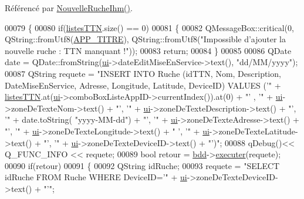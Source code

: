 Référencé par \hyperlink{class_nouvelle_ruche_ihm_a338b9af0b96ed0839a8d5008c8c89cc4}{Nouvelle\+Ruche\+Ihm()}.


\begin{DoxyCode}
00079 \{
00080     \textcolor{keywordflow}{if}(\hyperlink{class_nouvelle_ruche_ihm_a0c97db3419bafe928aabed3aa01d46fb}{listesTTN}.size() == 0)
00081     \{
00082         QMessageBox::critical(0, QString::fromUtf8(\hyperlink{parametres_8h_ace364d1ce44aa9f79bcff6e3752c4a5f}{APP\_TITRE}), QString::fromUtf8(\textcolor{stringliteral}{"Impossible
       d'ajouter la nouvelle ruche : TTN manquant !"}));
00083         \textcolor{keywordflow}{return};
00084     \}
00085 
00086     QDate date = QDate::fromString(\hyperlink{class_nouvelle_ruche_ihm_a46c1f0446fc75c67847d152d89d75960}{ui}->dateEditMiseEnService->text(), \textcolor{stringliteral}{"dd/MM/yyyy"});
00087     QString requete = \textcolor{stringliteral}{"INSERT INTO Ruche (idTTN, Nom, Description, DateMiseEnService, Adresse, Longitude,
       Latitude, DeviceID) VALUES ('"} + \hyperlink{class_nouvelle_ruche_ihm_a0c97db3419bafe928aabed3aa01d46fb}{listesTTN}.at(\hyperlink{class_nouvelle_ruche_ihm_a46c1f0446fc75c67847d152d89d75960}{ui}->comboBoxListeAppID->currentIndex()).at(0) + \textcolor{stringliteral}{"' ,
       '"} + \hyperlink{class_nouvelle_ruche_ihm_a46c1f0446fc75c67847d152d89d75960}{ui}->zoneDeTexteNom->text() + \textcolor{stringliteral}{"', '"} + \hyperlink{class_nouvelle_ruche_ihm_a46c1f0446fc75c67847d152d89d75960}{ui}->zoneDeTexteDescription->text() + \textcolor{stringliteral}{"', '"} + date.toString(\textcolor{stringliteral}{
      "yyyy-MM-dd"}) + \textcolor{stringliteral}{"', '"} + \hyperlink{class_nouvelle_ruche_ihm_a46c1f0446fc75c67847d152d89d75960}{ui}->zoneDeTexteAdresse->text() + \textcolor{stringliteral}{"', '"} + \hyperlink{class_nouvelle_ruche_ihm_a46c1f0446fc75c67847d152d89d75960}{ui}->zoneDeTexteLongitude->text() + \textcolor{stringliteral}{"
      ', '"} + \hyperlink{class_nouvelle_ruche_ihm_a46c1f0446fc75c67847d152d89d75960}{ui}->zoneDeTexteLatitude->text() + \textcolor{stringliteral}{"', '"} + \hyperlink{class_nouvelle_ruche_ihm_a46c1f0446fc75c67847d152d89d75960}{ui}->zoneDeTexteDeviceID->text() + \textcolor{stringliteral}{"')"};
00088     qDebug()<< Q\_FUNC\_INFO << requete;
00089     \textcolor{keywordtype}{bool} retour = \hyperlink{class_nouvelle_ruche_ihm_af552d9e6944c266060860d911878cff7}{bdd}->\hyperlink{class_base_de_donnees_aa8de5f8f8bb17edc43f5c0ee33712081}{executer}(requete);
00090     \textcolor{keywordflow}{if}(retour)
00091     \{
00092         QString idRuche;
00093         requete = \textcolor{stringliteral}{"SELECT idRuche FROM Ruche WHERE DeviceID='"} + \hyperlink{class_nouvelle_ruche_ihm_a46c1f0446fc75c67847d152d89d75960}{ui}->zoneDeTexteDeviceID->text() + \textcolor{stringliteral}{"'"};

\end{DoxyCode}
